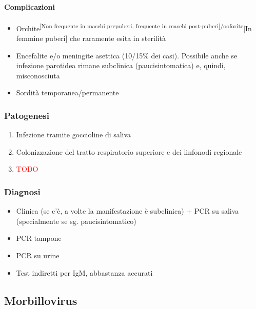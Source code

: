 \documentclass[italian,]{article}
\providecommand{\tightlist}{%
  \setlength{\itemsep}{0pt}\setlength{\parskip}{0pt}}
\newcommand{\TODO}[1]{\textcolor{red}{\textsf{\footnotesize{TODO #1}}}} %
\begin{document}
\hypertarget{complicazioni}{%
\paragraph{Complicazioni}\label{complicazioni}}

\begin{itemize}
\tightlist
\item
  Orchite\textsuperscript{{[}Non frequente in maschi prepuberi,
  frequente in maschi post-puberi{]}/ooforite}{[}In femmine puberi{]}
  che raramente esita in sterilità
\item
  Encefalite e/o meningite asettica (10/15\% dei casi). Possibile anche
  se infezione parotidea rimane subclinica (paucisintomatica) e, quindi,
  misconosciuta
\item
  Sordità temporanea/permanente
\end{itemize}

\hypertarget{patogenesi-8}{%
\subsubsection{Patogenesi}\label{patogenesi-8}}

\begin{enumerate}
\def\labelenumi{\arabic{enumi}.}
\setcounter{enumi}{-1}
\item
  Infezione tramite goccioline di saliva
\item
  Colonizzazione del tratto respiratorio superiore e dei linfonodi
  regionale
\item
  \TODO{}
\end{enumerate}

\hypertarget{diagnosi-14}{%
\subsubsection{Diagnosi}\label{diagnosi-14}}

\begin{itemize}
\tightlist
\item
  Clinica (se c'è, a volte la manifestazione è subclinica) + PCR su
  saliva (specialmente se sg. paucisintomatico)
\item
  PCR tampone
\item
  PCR su urine
\item
  Test indiretti per IgM, abbastanza accurati
\end{itemize}

\hypertarget{morbillovirus}{%
\subsection{Morbillovirus}\label{morbillovirus}}
\end{document}
